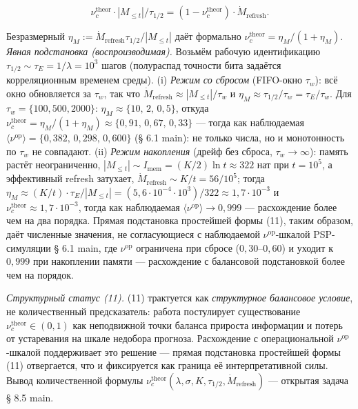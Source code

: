 \documentclass[pdflatex,sn-mathphys-ay]{sn-jnl}
\begin{document}
\[\nu_c^{\text{theor}} \cdot |M_{\le t}| / \tau_{1/2} = (1 - \nu_c^{\text{theor}}) \cdot \dot{M}_{\text{refresh}}.\]



Безразмерный \(\eta_M := \dot{M}_{\text{refresh}} \tau_{1/2} / |M_{\le t}|\) даёт формально \(\nu_c^{\text{theor}} = \eta_M / (1 + \eta_M)\). \emph{Явная подстановка (воспроизводимая).} Возьмём рабочую идентификацию \(\tau_{1/2} \sim \tau_E = 1/\lambda = 10^3\) шагов (полураспад точности бита задаётся корреляционным временем среды). (i) \emph{Режим со сбросом} (FIFO-окно \(\tau_w\)): всё окно обновляется за \(\tau_w\), так что \(\dot M_{\text{refresh}} \approx |M_{\le t}|/\tau_w\) и \(\eta_M \approx \tau_{1/2}/\tau_w = \tau_E/\tau_w\). Для \(\tau_w = \{100, 500, 2000\}\): \(\eta_M \approx \{10,\, 2,\, 0{,}5\}\), откуда \(\nu_c^{\text{theor}} = \eta_M/(1+\eta_M) \approx \{0{,}91,\, 0{,}67,\, 0{,}33\}\) --- тогда как наблюдаемая \(\langle\nu^{\text{op}}\rangle = \{0{,}382,\, 0{,}298,\, 0{,}600\}\) (§ 6.1 main): не только числа, но и монотонность по \(\tau_w\) не совпадают. (ii) \emph{Режим накопления} (дрейф без сброса, \(\tau_w \to \infty\)): память растёт неограниченно, \(|M_{\le t}| \sim I_{\text{mem}} = (K/2)\ln t \approx 322\) нат при \(t = 10^5\), а эффективный refresh затухает, \(\dot M_{\text{refresh}} \sim K/t = 56/10^5\); тогда \(\eta_M \approx (K/t)\cdot\tau_E/|M_{\le t}| = (5{,}6\cdot10^{-4}\cdot10^3)/322 \approx 1{,}7\cdot10^{-3}\) и \(\nu_c^{\text{theor}} \approx 1{,}7\cdot10^{-3}\), тогда как наблюдаемая \(\langle\nu^{\text{op}}\rangle \to 0{,}999\) --- расхождение более чем на два порядка. Прямая подстановка простейшей формы (11), таким образом, даёт численные значения, не согласующиеся с наблюдаемой \(\nu^{\text{op}}\)-шкалой PSP-симуляции § 6.1 main, где \(\nu^{\text{op}}\) ограничена при сбросе (\(0{,}30\)--\(0{,}60\)) и уходит к \(0{,}999\) при накоплении памяти --- расхождение с балансовой подстановкой более чем на порядок.



\emph{Структурный статус (11).} (11) трактуется как \emph{структурное балансовое условие}, не количественный предсказатель: работа постулирует существование \(\nu_c^{\text{theor}} \in (0, 1)\) как неподвижной точки баланса прироста информации и потерь от устаревания на шкале недобора прогноза. Расхождение с операциональной \(\nu^{\text{op}}\)-шкалой поддерживает это решение --- прямая подстановка простейшей формы (11) отвергается, что и фиксируется как граница её интерпретативной силы. Вывод количественной формулы \(\nu_c^{\text{theor}}(\lambda, \sigma, K, \tau_{1/2}, \dot M_{\text{refresh}})\) --- открытая задача § 8.5 main.
\end{document}
